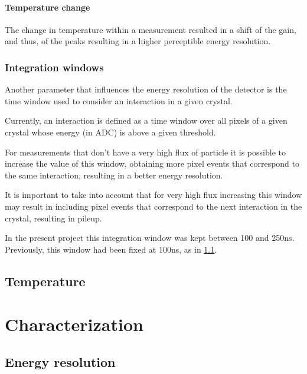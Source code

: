 \paragraph*{Temperature change}

The change in temperature within a measurement resulted in a shift of the gain, and thus, of the peaks resulting in a higher perceptible energy resolution.

\subsubsection{Integration windows}

Another parameter that influences the energy resolution of the detector is the time window used to consider an interaction in a given crystal.

Currently, an interaction is defined as a time window over all pixels of a given crystal whose energy (in ADC) is above a given threshold.

For measurements that don't have a very high flux of particle it is possible to increase the value of this window, obtaining more pixel events that correspond to the same interaction, resulting in a better energy resolution.

It is important to take into account that for very high flux increasing this window may result in including pixel events that correspond to the next interaction in the crystal, resulting in pileup.

In the present project this integration window was kept between 100 and 250ns. Previously, this window had been fixed at 100ns, as in \ref{}.

\subsection{Temperature}\label{ssec:temperature}

\section{Characterization}\label{sec:characterization}

\subsection{Energy resolution}

